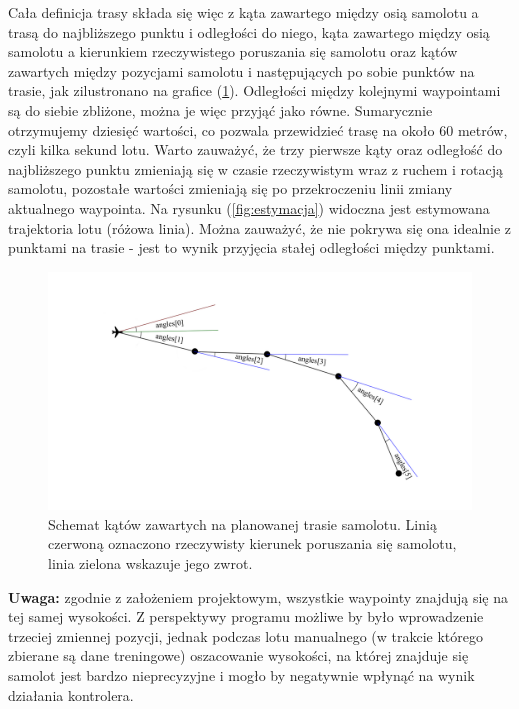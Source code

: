 \documentclass[12pt, a4paper]{article}
\let\oldref\ref
\renewcommand{\ref}[1]{(\oldref{#1})}
\begin{document}
Cała definicja trasy składa się więc z kąta zawartego między osią samolotu a trasą do najbliższego punktu i odległości do niego, kąta zawartego między osią samolotu a kierunkiem rzeczywistego poruszania się samolotu oraz kątów zawartych między pozycjami samolotu i następujących po sobie punktów na trasie, jak zilustronano na grafice \ref{fig:katy}. Odległości między kolejnymi waypointami są do siebie zbliżone, można je więc przyjąć jako równe. Sumarycznie otrzymujemy dziesięć wartości, co pozwala przewidzieć trasę na około 60 metrów, czyli kilka sekund lotu. Warto zauważyć, że trzy pierwsze kąty oraz odległość do najbliższego punktu zmieniają się w czasie rzeczywistym wraz z ruchem i rotacją samolotu, pozostałe wartości zmieniają się po przekroczeniu linii zmiany aktualnego waypointa. Na rysunku \ref{fig:estymacja} widoczna jest estymowana trajektoria lotu (różowa linia). Można zauważyć, że nie pokrywa się ona idealnie z punktami na trasie - jest to wynik przyjęcia stałej odległości między punktami.

 \begin{figure}[ht]
    \centering
    \includegraphics[width=1\textwidth]{angles}
    \caption{Schemat kątów zawartych na planowanej trasie samolotu. Linią czerwoną oznaczono rzeczywisty kierunek poruszania się samolotu, linia zielona wskazuje jego zwrot.}
    \label{fig:katy}
\end{figure}

\textbf{Uwaga:} zgodnie z założeniem projektowym, wszystkie waypointy znajdują się na tej samej wysokości. Z perspektywy programu możliwe by było wprowadzenie trzeciej zmiennej pozycji, jednak podczas lotu manualnego (w trakcie którego zbierane są dane treningowe) oszacowanie wysokości, na której znajduje się samolot jest bardzo nieprecyzyjne i mogło by negatywnie wpłynąć na wynik działania kontrolera.
\end{document}
